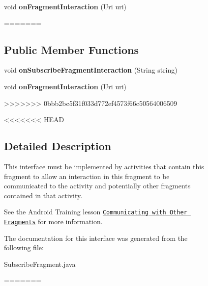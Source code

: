 \begin{figure}[H]
\begin{DoxyCompactItemize}
\item 
\hypertarget{interfacecom_1_1example_1_1sel_1_1lostfound_1_1SubscribeFragment_1_1OnFragmentInteractionListener_a419de726f221023d20f573225984783b}{void {\bfseries on\-Fragment\-Interaction} (Uri uri)}\label{interfacecom_1_1example_1_1sel_1_1lostfound_1_1SubscribeFragment_1_1OnFragmentInteractionListener_a419de726f221023d20f573225984783b}
=======
\subsection*{\-Public \-Member \-Functions}
\begin{DoxyCompactItemize}
\item 
\hypertarget{interfacecom_1_1example_1_1sel_1_1lostfound_1_1SubscribeFragment_1_1OnFragmentInteractionListener_a49e52bf52ac045228eda481eaa5ad3a3}{void {\bfseries on\-Subscribe\-Fragment\-Interaction} (\-String string)}\label{interfacecom_1_1example_1_1sel_1_1lostfound_1_1SubscribeFragment_1_1OnFragmentInteractionListener_a49e52bf52ac045228eda481eaa5ad3a3}

\item 
\hypertarget{interfacecom_1_1example_1_1sel_1_1lostfound_1_1SubscribeFragment_1_1OnFragmentInteractionListener_a419de726f221023d20f573225984783b}{void {\bfseries on\-Fragment\-Interaction} (\-Uri uri)}\label{interfacecom_1_1example_1_1sel_1_1lostfound_1_1SubscribeFragment_1_1OnFragmentInteractionListener_a419de726f221023d20f573225984783b}
>>>>>>> 0bbb2bc5f31f033d772ef4573f66c50564006509

\end{DoxyCompactItemize}


<<<<<<< HEAD
\subsection{Detailed Description}
This interface must be implemented by activities that contain this fragment to allow an interaction in this fragment to be communicated to the activity and potentially other fragments contained in that activity. 

See the Android Training lesson \href{http://developer.android.com/training/basics/fragments/communicating.html}{\tt Communicating with Other Fragments} for more information. 

The documentation for this interface was generated from the following file\-:\begin{DoxyCompactItemize}
\item 
Subscribe\-Fragment.\-java\end{DoxyCompactItemize}
=======

\end{DoxyCompactItemize}
\end{figure}

